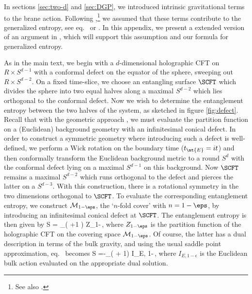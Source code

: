 %

In sections \ref{sec:two-d} and \ref{sec:DGP}, we introduced intrinsic gravitational terms to the brane action. Following \cite{Almheiri:2019hni},\footnote{See also \cite{Almheiri:2019psf, Almheiri:2019yqk, Chen:2019uhq, Penington:2019kki, Almheiri:2019qdq}.} we assumed that these terms contribute to the generalized entropy, \eg see eq.~ or .
In this appendix, we present a extended version of an argument in \cite{Myers:2010tj}, which will support this assumption and our formula for generalized entropy. 

As in the main text, we begin with a $d$-dimensional holographic CFT on $R\times S^{d-1}$ with a conformal defect on the equator of the sphere, sweeping out $R\times S^{d-2}$. On a fixed time-slice, we choose an entangling surface $\SCFT$ which divides the sphere into two equal halves along a maximal $S^{d-2}$ which lies orthogonal to the conformal defect. Now we wish to determine the entanglement entropy between the two halves
of the system, as sketched in figure \ref{fig:defect}. Recall that with the geometric approach \cite{Callan:1994py}, we must evaluate the partition function on a (Euclidean) background geometry with an infinitesimal conical defect. In order to construct a symmetric geometry where introducing such a defect is well-defined, we perform a Wick rotation on the boundary time (\ie $t_\mt{E}=it$) and then conformally transform the Euclidean background metric to a round $S^{d}$ with the conformal defect lying on a maximal $S^{d-1}$ on this background. Now $\SCFT$ remains a maximal $S^{d-2}$ which runs orthogonal to the defect and pierces the latter on a $S^{d-3}$. With this construction, there is a rotational symmetry in the two dimensions orthogonal to $\SCFT$. To evaluate the corresponding entanglement entropy, we construct $\mathcal{M}_{1-\eps}$, the `$n$-fold cover' with $n=1-\eps$, by introducing an infinitesimal conical defect at $\SCFT$. The entanglement entropy is then given by
\beq\label{entro9}
S = \lim_{\eps{}}\left( \frac{\partial\ }{\partial\eps}+1 \right)\log
Z_{1-\eps}\,,
\eeq
where $Z_{1-\eps}$ is the partition function of the holographic CFT on the covering space $\mathcal{M}_{1-\eps}$. Of course, the latter has a dual description in terms of the bulk gravity, and using the usual saddle point approximation, eq.~ becomes \cite{Myers:2010tj}
\beq\label{entropylimit}
S =-\lim_{\epsilon{}}\Big(\frac{\partial}{\partial \epsilon} + 1\Big) I_{E, 1-\epsilon}\,,
\eeq 
where $I_{E,1-\epsilon}$ is the Euclidean bulk action evaluated on the appropriate dual solution.

